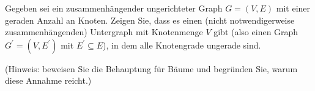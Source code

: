 
\begin{exercise}

Gegeben sei ein zusammenhängender ungerichteter Graph $G = (V,E)$ mit einer geraden Anzahl an Knoten.
Zeigen Sie, dass es einen (nicht notwendigerweise zusammenhängenden) Untergraph mit
Knotenmenge $V$ gibt (also einen Graph $G^\prime = (V, E^\prime)$ mit $E^\prime \subseteq E$),
in dem alle Knotengrade ungerade sind.

(Hinweis: beweisen Sie die Behauptung für Bäume und begründen Sie, warum diese Annahme reicht.)

\end{exercise}


